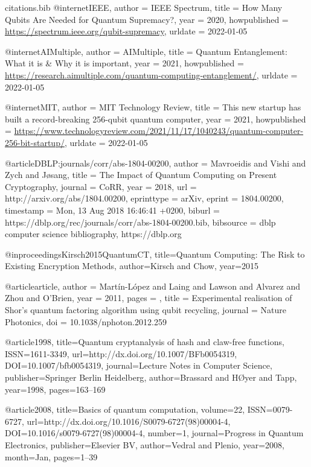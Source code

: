 \documentclass[aps,preprintnumbers,twocolumn]{revtex4}
\begin{document}
\begin{filecontents}{citations.bib}
@internet{IEEE,
  author = {IEEE Spectrum},
  title = {How Many Qubits Are Needed for Quantum Supremacy?},
  year = 2020,
  howpublished = {\url{https://spectrum.ieee.org/qubit-supremacy}},
  urldate = {2022-01-05}
}

@internet{AIMultiple,
  author = {AIMultiple},
  title = {Quantum Entanglement: What it is \& Why it is important},
  year = 2021,
  howpublished = {\url{https://research.aimultiple.com/quantum-computing-entanglement/}},
  urldate = {2022-01-05}
}

@internet{MIT,
  author = {MIT Technology Review},
  title = {This new startup has built a record-breaking 256-qubit quantum computer},
  year = 2021,
  howpublished = {\url{https://www.technologyreview.com/2021/11/17/1040243/quantum-computer-256-bit-startup/}},
  urldate = {2022-01-05}
}

@article{DBLP:journals/corr/abs-1804-00200,
  author    = {Mavroeidis and
               Vishi and
               Zych and
               J{\o}sang},
  title     = {The Impact of Quantum Computing on Present Cryptography},
  journal   = {CoRR},
  year      = {2018},
  url       = {http://arxiv.org/abs/1804.00200},
  eprinttype = {arXiv},
  eprint    = {1804.00200},
  timestamp = {Mon, 13 Aug 2018 16:46:41 +0200},
  biburl    = {https://dblp.org/rec/journals/corr/abs-1804-00200.bib},
  bibsource = {dblp computer science bibliography, https://dblp.org}
}

@inproceedings{Kirsch2015QuantumCT,
  title={Quantum Computing: The Risk to Existing Encryption Methods},
  author={Kirsch and Chow},
  year={2015}
}

@article{article,
author = {Martín-López and Laing and Lawson and Alvarez and Zhou and O'Brien},
year = {2011},
pages = {},
title = {Experimental realisation of Shor's quantum factoring algorithm using
qubit recycling},
journal = {Nature Photonics},
doi = {10.1038/nphoton.2012.259}
}

@article{1998,
   title={Quantum cryptanalysis of hash and claw-free functions},
   ISSN={1611-3349},
   url={http://dx.doi.org/10.1007/BFb0054319},
   DOI={10.1007/bfb0054319},
   journal={Lecture Notes in Computer Science},
   publisher={Springer Berlin Heidelberg},
   author={Brassard and HØyer and Tapp},
   year={1998},
   pages={163–169}
}

@article{2008,
   title={Basics of quantum computation},
   volume={22},
   ISSN={0079-6727},
   url={http://dx.doi.org/10.1016/S0079-6727(98)00004-4},
   DOI={10.1016/s0079-6727(98)00004-4},
   number={1},
   journal={Progress in Quantum Electronics},
   publisher={Elsevier BV},
   author={Vedral and Plenio},
   year={2008},
   month={Jan},
   pages={1–39}
}


\end{filecontents}
\end{document}
